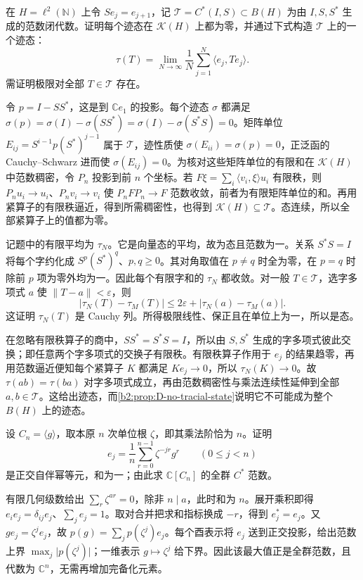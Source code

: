 \begin{exercise}\label{b2:ex:D-no-tracial-state}
	在 \(H=\ell^2(\mathbb N)\) 上令 \(Se_j=e_{j+1}\)，记 \(\mathcal T=C^*(I,S)\subset B(H)\) 为由 \(I,S,S^*\) 生成的范数闭代数。证明每个迹态在 \(\mathcal K(H)\) 上都为零，并通过下式构造 \(\mathcal T\) 上的一个迹态：
	\[
		\tau(T)=\lim_{N\to\infty}\frac1N\sum_{j=1}^N\langle e_j,Te_j\rangle.
	\]
	需证明极限对全部 \(T\in\mathcal T\) 存在。
\end{exercise}
\begin{solution}
	令 \(p=I-SS^*\)，这是到 \(\mathbb Ce_1\) 的投影。每个迹态 \(\sigma\) 都满足 \(\sigma(p)=\sigma(I)-\sigma(SS^*)=\sigma(I)-\sigma(S^*S)=0\)。矩阵单位 \(E_{ij}=S^{i-1}p(S^*)^{j-1}\) 属于 \(\mathcal T\)，迹性质使 \(\sigma(E_{ii})=\sigma(p)=0\)，正泛函的 Cauchy--Schwarz 进而使 \(\sigma(E_{ij})=0\)。为核对这些矩阵单位的有限和在 \(\mathcal K(H)\) 中范数稠密，令 \(P_n\) 投影到前 \(n\) 个坐标。若 \(F\xi=\sum_i\langle v_i,\xi\rangle u_i\) 有限秩，则 \(P_nu_i\to u_i\)、\(P_nv_i\to v_i\) 使 \(P_nFP_n\to F\) 范数收敛，前者为有限矩阵单位的和。再用紧算子的有限秩逼近，得到所需稠密性，也得到 \(\mathcal K(H)\subseteq\mathcal T\)。态连续，所以全部紧算子上的值都为零。

	记题中的有限平均为 \(\tau_N\)。它是向量态的平均，故为态且范数为一。关系 \(S^*S=I\) 将每个字约化成 \(S^p(S^*)^q\)、\(p,q\ge0\)。其对角取值在 \(p\ne q\) 时全为零，在 \(p=q\) 时除前 \(p\) 项为零外均为一。因此每个有限字和的 \(\tau_N\) 都收敛。对一般 \(T\in\mathcal T\)，选字多项式 \(a\) 使 \(\|T-a\|<\varepsilon\)，则
	\[
		|\tau_N(T)-\tau_M(T)|\le2\varepsilon+|\tau_N(a)-\tau_M(a)|.
	\]
	这证明 \(\tau_N(T)\) 是 Cauchy 列。所得极限线性、保正且在单位上为一，所以是态。

	在忽略有限秩算子的商中，\(SS^*=S^*S=I\)，所以由 \(S,S^*\) 生成的字多项式彼此交换；即任意两个字多项式的交换子有限秩。有限秩算子作用于 \(e_j\) 的结果趋零，再用范数逼近便知每个紧算子 \(K\) 都满足 \(Ke_j\to0\)，所以 \(\tau_N(K)\to0\)。故 \(\tau(ab)=\tau(ba)\) 对字多项式成立，再由范数稠密性与乘法连续性延伸到全部 \(a,b\in\mathcal T\)。这给出迹态，而\cref{b2:prop:D-no-tracial-state}说明它不可能成为整个 \(B(H)\) 上的迹态。
\end{solution}

\begin{exercise}\label{b2:ex:D-cyclic-fourier}
	设 \(C_n=\langle g\rangle\)，取本原 \(n\) 次单位根 \(\zeta\)，即其乘法阶恰为 \(n\)。证明
	\[
		e_j=\frac1n\sum_{r=0}^{n-1}\zeta^{-jr}g^r\qquad(0\le j<n)
	\]
	是正交自伴幂等元，和为一；由此求 \(\mathbb C[C_n]\) 的全群 \(C^*\) 范数。
\end{exercise}
\begin{solution}
	有限几何级数给出 \(\sum_r\zeta^{ar}=0\)，除非 \(n\mid a\)，此时和为 \(n\)。展开乘积即得 \(e_ie_j=\delta_{ij}e_j\)、\(\sum_j e_j=1\)。取对合并把求和指标换成 \(-r\)，得到 \(e_j^*=e_j\)。又 \(ge_j=\zeta^j e_j\)，故 \(p(g)=\sum_jp(\zeta^j)e_j\)。每个酉表示将 \(e_j\) 送到正交投影，给出范数上界 \(\max_j\bigl|p(\zeta^j)\bigr|\)；一维表示 \(g\mapsto\zeta^j\) 给下界。因此该最大值正是全群范数，且代数为 \(\mathbb C^n\)，无需再增加完备化元素。
\end{solution}

